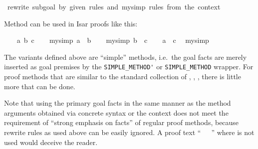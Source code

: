 \begin{isabellebody}
{}\ {}rewrite\ subgoal\ by\ given\ rules\ and\ my{}simp\ rules\ from\ the\ context{}%
\endisatagML
{\isafoldML}%
%
\isadelimML
%
\endisadelimML
%
\begin{isamarkuptext}%
\medskip Method \hyperlink{method.my-simp'}{\mbox{}} can be used in Isar proofs
  like this:%
\end{isamarkuptext}%
\isamarkuptrue%
\isamarkupfalse%
\isanewline
{}\isanewline
%
\isadelimproof
\ \ %
\endisadelimproof
%
\isatagproof
{}\isamarkupfalse%
\ a\ b\ c\isanewline
\ \ \isamarkupfalse%
\ {}my{}simp{}{}\ {}a\ {}\ b{}\isanewline
\ \ \isamarkupfalse%
\ {}my{}simp{}{}\ {}b\ {}\ c{}\isanewline
\ \ \isamarkupfalse%
\ {}a\ {}\ c{}\ \isamarkupfalse%
\ my{}simp{}%
\endisatagproof
{\isafoldproof}%
%
\isadelimproof
\isanewline
%
\endisadelimproof
{}\isamarkupfalse%
%
\begin{isamarkuptext}%
\medskip The \hyperlink{method.my-simp}{\mbox{}} variants defined above are
  ``simple'' methods, i.e.\ the goal facts are merely inserted as goal
  premises by the \verb|SIMPLE_METHOD'| or \verb|SIMPLE_METHOD| wrapper.
  For proof methods that are similar to the standard collection of
  \hyperlink{method.simp}{\mbox{}}, \hyperlink{method.blast}{\mbox{}}, \hyperlink{method.fast}{\mbox{}}, \hyperlink{method.auto}{\mbox{}}
  there is little more that can be done.

  Note that using the primary goal facts in the same manner as the
  method arguments obtained via concrete syntax or the context does
  not meet the requirement of ``strong emphasis on facts'' of regular
  proof methods, because rewrite rules as used above can be easily
  ignored.  A proof text ``\hyperlink{command.using}{\mbox{}}~~\hyperlink{command.by}{\mbox{}}~'' where  is not used would
  deceive the reader.


\end{isamarkuptext}
\end{isabellebody}

